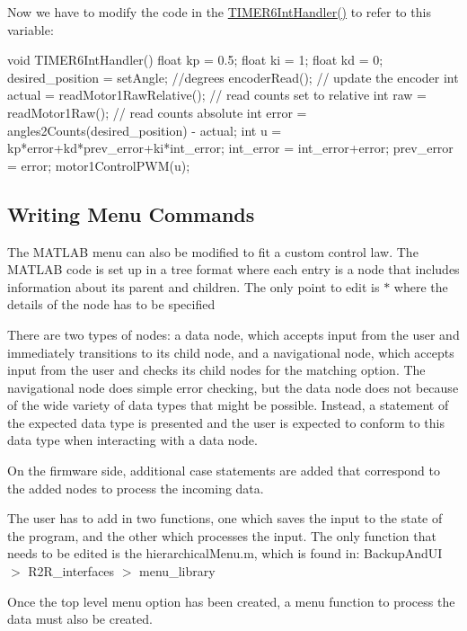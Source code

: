 Now we have to modify the code in the {\ttfamily \mbox{\hyperlink{r2r_8h_a57b21594b75d4b2a140a1f9bbb1465e8}{T\+I\+M\+E\+R6\+Int\+Handler()}}} to refer to this variable\+: \begin{DoxyVerb}void TIMER6IntHandler(){
    float kp = 0.5;
    float ki = 1;
    float kd = 0;
    desired_position = setAngle; //degrees
    encoderRead(); // update the encoder
    int actual = readMotor1RawRelative(); // read counts set to relative
    int raw = readMotor1Raw(); // read counts absolute
    int error = angles2Counts(desired_position) - actual;
    int u = kp*error+kd*prev_error+ki*int_error;
     int_error = int_error+error;
     prev_error = error;
    motor1ControlPWM(u);
 }  
\end{DoxyVerb}
\hypertarget{index_menu}{}\subsection{Writing Menu Commands}\label{index_menu}
The M\+A\+T\+L\+AB menu can also be modified to fit a custom control law. The M\+A\+T\+L\+AB code is set up in a tree format where each entry is a node that includes information about its parent and children. The only point to edit is $\ast$ where the details of the node has to be specified

There are two types of nodes\+: a data node, which accepts input from the user and immediately transitions to its child node, and a navigational node, which accepts input from the user and checks its child nodes for the matching option. The navigational node does simple error checking, but the data node does not because of the wide variety of data types that might be possible. Instead, a statement of the expected data type is presented and the user is expected to conform to this data type when interacting with a data node.

On the firmware side, additional case statements are added that correspond to the added nodes to process the incoming data.

The user has to add in two functions, one which saves the input to the state of the program, and the other which processes the input. The only function that needs to be edited is the {\ttfamily hierarchical\+Menu.\+m}, which is found in\+: {\ttfamily Backup\+And\+UI $>$ R2\+R\+\_\+interfaces $>$ menu\+\_\+library}

 Once the top level menu option has been created, a menu function to process the data must also be created.

